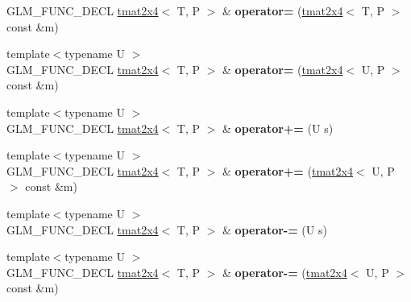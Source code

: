 \begin{DoxyCompactItemize}
\item 
\hypertarget{structglm_1_1detail_1_1tmat2x4_ac173ba8a4d80a63a46c3d883b9a53833}{G\-L\-M\-\_\-\-F\-U\-N\-C\-\_\-\-D\-E\-C\-L \hyperlink{structglm_1_1detail_1_1tmat2x4}{tmat2x4}$<$ T, P $>$ \& {\bfseries operator=} (\hyperlink{structglm_1_1detail_1_1tmat2x4}{tmat2x4}$<$ T, P $>$ const \&m)}\label{structglm_1_1detail_1_1tmat2x4_ac173ba8a4d80a63a46c3d883b9a53833}

\item 
\hypertarget{structglm_1_1detail_1_1tmat2x4_a422287398bdb26f5d22bd9e91656889d}{{\footnotesize template$<$typename U $>$ }\\G\-L\-M\-\_\-\-F\-U\-N\-C\-\_\-\-D\-E\-C\-L \hyperlink{structglm_1_1detail_1_1tmat2x4}{tmat2x4}$<$ T, P $>$ \& {\bfseries operator=} (\hyperlink{structglm_1_1detail_1_1tmat2x4}{tmat2x4}$<$ U, P $>$ const \&m)}\label{structglm_1_1detail_1_1tmat2x4_a422287398bdb26f5d22bd9e91656889d}

\item 
\hypertarget{structglm_1_1detail_1_1tmat2x4_a5bb3a875e7d771e04ef778dd65c69570}{{\footnotesize template$<$typename U $>$ }\\G\-L\-M\-\_\-\-F\-U\-N\-C\-\_\-\-D\-E\-C\-L \hyperlink{structglm_1_1detail_1_1tmat2x4}{tmat2x4}$<$ T, P $>$ \& {\bfseries operator+=} (U s)}\label{structglm_1_1detail_1_1tmat2x4_a5bb3a875e7d771e04ef778dd65c69570}

\item 
\hypertarget{structglm_1_1detail_1_1tmat2x4_a298436a3ccd92e48b55bc4b8a39dd778}{{\footnotesize template$<$typename U $>$ }\\G\-L\-M\-\_\-\-F\-U\-N\-C\-\_\-\-D\-E\-C\-L \hyperlink{structglm_1_1detail_1_1tmat2x4}{tmat2x4}$<$ T, P $>$ \& {\bfseries operator+=} (\hyperlink{structglm_1_1detail_1_1tmat2x4}{tmat2x4}$<$ U, P $>$ const \&m)}\label{structglm_1_1detail_1_1tmat2x4_a298436a3ccd92e48b55bc4b8a39dd778}

\item 
\hypertarget{structglm_1_1detail_1_1tmat2x4_a35c469a505e64d85b1903cb8236bb40e}{{\footnotesize template$<$typename U $>$ }\\G\-L\-M\-\_\-\-F\-U\-N\-C\-\_\-\-D\-E\-C\-L \hyperlink{structglm_1_1detail_1_1tmat2x4}{tmat2x4}$<$ T, P $>$ \& {\bfseries operator-\/=} (U s)}\label{structglm_1_1detail_1_1tmat2x4_a35c469a505e64d85b1903cb8236bb40e}

\item 
\hypertarget{structglm_1_1detail_1_1tmat2x4_a4649ad6c38956df334d0b86042e207bd}{{\footnotesize template$<$typename U $>$ }\\G\-L\-M\-\_\-\-F\-U\-N\-C\-\_\-\-D\-E\-C\-L \hyperlink{structglm_1_1detail_1_1tmat2x4}{tmat2x4}$<$ T, P $>$ \& {\bfseries operator-\/=} (\hyperlink{structglm_1_1detail_1_1tmat2x4}{tmat2x4}$<$ U, P $>$ const \&m)}\label{structglm_1_1detail_1_1tmat2x4_a4649ad6c38956df334d0b86042e207bd}


\end{DoxyCompactItemize}
